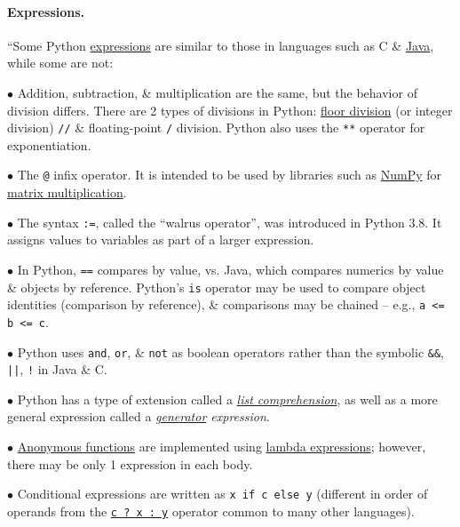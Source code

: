 \documentclass{article}
\numberwithin{equation}{section}
\begin{document}
\paragraph{Expressions.} ``Some Python \href{https://en.wikipedia.org/wiki/Expression_(computer_science)}{expressions} are similar to those in languages such as C \& \href{https://en.wikipedia.org/wiki/Java_(programming_language)}{Java}, while some are not:
\begin{enumerate*}
	\item[$\bullet$] Addition, subtraction, \& multiplication are the same, but the behavior of division differs. There are 2 types of divisions in Python: \href{https://en.wikipedia.org/wiki/Floor_division}{floor division} (or integer division) \texttt{//} \& floating-point \texttt{/} division. Python also uses the \texttt{**} operator for exponentiation.
	\item[$\bullet$] The \texttt{@} infix operator. It is intended to be used by libraries such as \href{https://en.wikipedia.org/wiki/NumPy}{NumPy} for \href{https://en.wikipedia.org/wiki/Matrix_multiplication}{matrix multiplication}.
	\item[$\bullet$] The syntax \texttt{:=}, called the ``walrus operator'', was introduced in Python 3.8. It assigns values to variables as part of a larger expression.
	\item[$\bullet$] In Python, \texttt{==} compares by value, vs. Java, which compares numerics by value \& objects by reference. Python's \texttt{is} operator may be used to compare object identities (comparison by reference), \& comparisons may be chained -- e.g., \texttt{a <= b <= c}.
	\item[$\bullet$] Python uses \texttt{and}, \texttt{or}, \& \texttt{not} as boolean operators rather than the symbolic \verb|&&|, \verb!||!, \verb|!| in Java \& C.
	\item[$\bullet$] Python has a type of extension called a \href{https://en.wikipedia.org/wiki/List_comprehension#Python}{\textit{list comprehension}}, as well as a more general expression called a \textit{\href{https://en.wikipedia.org/wiki/Generator_(computer_programming)}{generator} expression}.
	\item[$\bullet$] \href{https://en.wikipedia.org/wiki/Anonymous_function}{Anonymous functions} are implemented using \href{https://en.wikipedia.org/wiki/Lambda_(programming)}{lambda expressions};  however, there may be only 1 expression in each body.
	\item[$\bullet$] Conditional expressions are written as \texttt{x if c else y} (different in order of operands from the \href{https://en.wikipedia.org/wiki/%3F:}{\texttt{c ? x : y}} operator common to many other languages).

\end{enumerate*}
\end{document}
